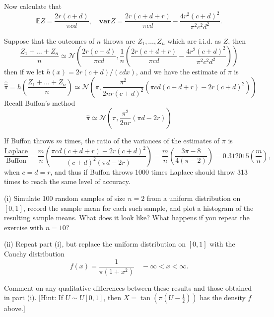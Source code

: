 Now calculate that 
\begin{equation}
\mathbb{E}Z = \frac{2r(c+d)}{\pi cd},\quad \mathbf{var}Z = \frac{2r(c+d+r)}{\pi cd} - \frac{4r^2(c+d)^2}{\pi^2 c^2d^2}. 
\end{equation}

Suppose that the outcomes of $n$ throws are $Z_1,\dots,Z_n$ which are i.i.d. as $Z$, then
\begin{equation}
\frac{Z_1+\dots +Z_n}{n} \simeq \mathcal{N} \left(\frac{2r(c+d)}{\pi cd},\frac 1n\left(\frac{2r(c+d+r)}{\pi cd} - \frac{4r^2(c+d)^2}{\pi^2 c^2d^2}\right)\right)
\end{equation}
then if we let $h(x)=2r(c+d)/(cdx)$, and we have the estimate of $\pi$ is 
\begin{equation}
\hat{\hat{\pi}} = h\left(\frac{Z_1+\dots +Z_n}{n}\right) \simeq \mathcal{N} \left(\pi,\frac{\pi^2}{2nr(c+d)^2}\left(\pi cd(c+d+r) - 2r(c+d)^2\right)\right)
\end{equation}
Recall Buffon's method
\begin{equation}
\hat{\pi} \simeq \mathcal{N} \left(\pi,\frac{\pi^2}{2nr}\left(\pi d - 2r\right)\right)
\end{equation}

If Buffon throws $m$ times, the ratio of the variances of the estimates of $\pi$ is 
\begin{equation}
\frac{\text{Laplace}}{\text{Buffon}} = \frac mn \left(\frac{\pi cd(c+d+r) - 2r(c+d)^2}{(c+d)^2(\pi d - 2r)} \right) = \frac mn \left(\frac{3\pi -8}{4(\pi -2)} \right) = 0.312015\left(\frac mn\right),
\end{equation}
when $c=d=r$, and thus if Buffon throws 1000 times Laplace should throw 313 times to reach the same level of accuracy.


\item (i) Simulate 100 random samples of size $n=2$ from a uniform distribution on $[0,1]$, record the sample mean for each such sample, and plot a histogram of the resulting sample means. What does it look like? What happens if you repeat the exercise with $n=10$?

(ii) Repeat part (i), but replace the uniform distribution on $[0,1]$ with the Cauchy distribution
\begin{equation}
f(x)=\frac{1}{\pi(1+x^2)}\quad -\infty<x<\infty.
\end{equation}

Comment on any qualitative differences between these results and those obtained in part (i). [Hint: If $U\sim U[0,1]$, then $X=\tan\left(\pi\left(U-\frac 12\right)\right)$ has the density $f$ above.]



